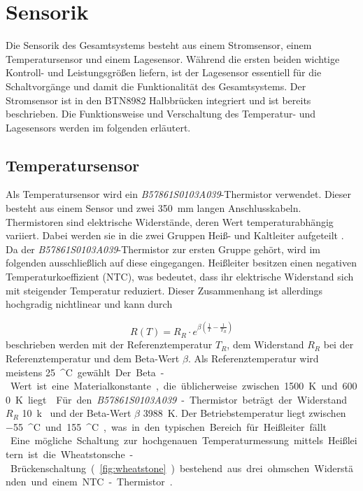 \section{Sensorik}
Die Sensorik des Gesamtsystems besteht aus einem Stromsensor, einem Temperatursensor und einem Lagesensor. Während die ersten beiden wichtige Kontroll- und Leistungsgrößen liefern, ist der Lagesensor essentiell für die Schaltvorgänge und damit die Funktionalität des Gesamtsystems. Der Stromsensor ist in den BTN8982 Halbbrücken integriert und ist bereits beschrieben. Die Funktionsweise und Verschaltung des Temperatur- und Lagesensors werden im folgenden erläutert. 

\subsection{Temperatursensor}\label{sub:temp}
Als Temperatursensor wird ein \textit{B57861S0103A039}-Thermistor verwendet. Dieser besteht aus einem Sensor und zwei \SI{350}{mm} langen Anschlusskabeln. Thermistoren sind elektrische Widerstände, deren Wert temperaturabhängig variiert. Dabei werden sie in die zwei Gruppen Heiß- und Kaltleiter aufgeteilt \cite{Stiny2015}. Da der \textit{B57861S0103A039}-Thermistor zur ersten Gruppe gehört, wird im folgenden ausschließlich auf diese eingegangen. Heißleiter besitzen einen negativen Temperaturkoeffizient (NTC), was bedeutet, dass ihr elektrische Widerstand sich mit steigender Temperatur reduziert. Dieser Zusammenhang ist allerdings hochgradig nichtlinear und kann durch 

\begin{equation} \label{eq:NTC}
R(T) = R_R \cdot e^{\beta\left(\frac{1}{T}-\frac{1}{T_R}\right)}  
\end{equation}
beschrieben werden mit der Referenztemperatur $T_R$, dem Widerstand $R_R$ bei der Referenztemperatur und dem Beta-Wert $\beta$. Als Referenztemperatur wird meistens \SI{25}{^\circ C} gewählt. Der Beta-Wert ist eine Materialkonstante, die üblicherweise zwischen \SI{1500}{K} und \SI{6000}{K} liegt \cite{Stiny2015}. Für den \textit{B57861S0103A039}-Thermistor beträgt der Widerstand $R_R$ \SI{10}{k\Omega} und der Beta-Wert $\beta$ \SI{3988}{K}. Der Betriebstemperatur liegt zwischen \SI{-55}{^\circ C} und \SI{155}{^\circ C}, was in den typischen Bereich für Heißleiter fällt \cite{Stiny2015}.\\
Eine mögliche Schaltung zur hochgenauen Temperaturmessung mittels Heißleitern ist die Wheatstonsche-Brückenschaltung (\autoref{fig:wheatstone}) bestehend aus drei ohmschen Widerständen und einem NTC-Thermistor \cite{Stiny2015}.

